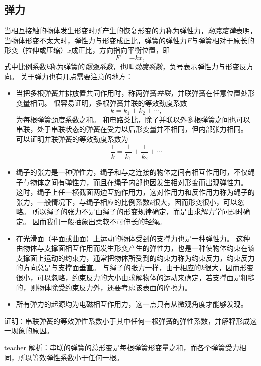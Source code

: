 \subsection{弹力}
当相互接触的物体发生形变时所产生的恢复形变的力称为弹性力，\emph{胡克定律}表明，当物体形变不太大时，弹性力与形变成正比，弹簧的弹性力$F$与弹簧相对于原长的形变（拉伸或压缩）$x$成正比，方向指向平衡位置，即
\begin{equation}
F = -kx,
\end{equation}
式中比例系数$k$称为弹簧的\emph{倔强系数}，也叫\emph{劲度系数}，负号表示弹性力与形变反方向。
关于弹力也有几点需要注意的地方：
\begin{itemize}
\item
当把多根弹簧并排放置共同作用时，称两弹簧\emph{并联}，并联弹簧在任意位置处形变量相同。
很容易证明，多根弹簧并联的等效劲度系数
\begin{equation}
k = k_1+k_2+\cdots,
\end{equation}
为每根弹簧劲度系数之和。
和电路类比，除了并联以外多根弹簧之间也可以串联，处于串联状态的弹簧在受力以后形变量并不相同，但内部张力相同。
可以证明并联弹簧的等效劲度系数为
\begin{equation}
\frac{1}{k} = \frac{1}{k_1}+\frac{1}{k_2}+\cdots
\end{equation}
\item 
绳子的张力是一种弹性力，绳子和与之连接的物体之间有相互作用时，不仅绳子与物体之间有弹性力，而且在绳子内部也因发生相对形变而出现弹性力。
这时，绳子上任一横截面两边互施作用力，这对作用力和反作用力称为绳子的张力，一般情况下，与绳子相应的比例系数$k$很大，因而形变很小，可以忽略。
所以绳子的张力不是由绳子的形变规律确定，而是由求解力学问题时确定。
因而我们一般抽象出柔软不可伸长的轻绳。
\item
在光滑面（平面或曲面）上运动的物体受到的支撑力也是一种弹性力。
这种由物体与支撑面相互作用而发生形变产生的弹性力，也是一种使物体约束在该支撑面上运动的约束力，通常把物体所受到的约束力称为约束反力，约束反力的方向总是与支撑面垂直。
与绳子的张力一样，由于相应的$k$很大，因而形变很小，可以忽略，约束反力的大小由求解物体的运动来确定，若支撑面是粗糙的，则物体除受约束反力外，还要考虑该表面的摩擦力。
\item
所有弹力的起源均为电磁相互作用力，这一点只有从微观角度才能够发现。

\end{itemize}



\begin{example}
证明：串联弹簧的等效弹性系数小于其中任何一根弹簧的弹性系数，并解释形成这一现象的原因。
\begin{taggedblock}{teacher}
\newline
解析：串联的弹簧的总形变是每根弹簧形变量之和，而各个弹簧受力相同，所以等效弹性系数小于任何一根。
\end{taggedblock}
\end{example}

